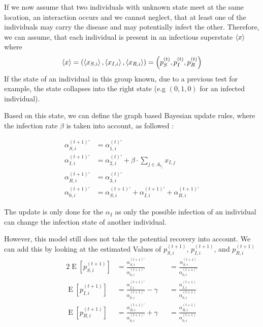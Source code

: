 If we now assume that two individuals with unknown state meet at the same location, an interaction occurs and we cannot neglect, that at least one of the individuals may carry the disease and may potentially infect the other. Therefore, we can assume, that each individual is present in an infectious superstate $\braket{x}$ where
\begin{equation}
    \braket{x} = \left(\braket{x_{S,i}}, \braket{x_{I,i}}, \braket{x_{R,i}}\right) = \left(p_S^{(t)},p_I^{(t)},p_R^{(t)}\right)
\end{equation}
If the state of an individual in this group known, due to a previous test for example, the state collapses into the right state (e.g $(0,1,0)$ for an infected individual).

Based on this state, we can define the graph based Bayesian update rules, where the infection rate $\beta$ is taken into account, as followed \cite{rice2006mathematical}:

\begin{align}
    \alpha_{S,i}^{(t+1)\prime} &= \alpha_{1,i}^{(t)\prime}\\
    \alpha_{I,i}^{(t+1)\prime} &= \alpha_{2,i}^{(t)\prime} + \beta \cdot
    \sum_{j\in A_{v_i}}  x_{I,j}\\
    \alpha_{R,i}^{(t+1)\prime} &= \alpha_{3,i}^{(t)\prime}\\
    \alpha_{0,i}^{(t+1)\prime} &= \alpha_{S,i}^{(t+1)\prime}+\alpha_{I,i}^{(t+1)\prime}+\alpha_{R,i}^{(t+1)\prime}
\end{align}

The update is only done for the $\alpha_I$ as only the possible infection of an individual can change the infection state of another individual.

However, this model still does not take the potential recovery into account. We can add this by looking at the estimated Values of $p_{S,i}^{(t+1)}$, $p_{I,i}^{(t+1)}$, and $p_{R,i}^{(t+1)}$ 
\begin{alignat}{2}
    \operatorname{E}[p_{S,i}^{(t+1)}] &= \frac{\alpha_{S,i}^{(t+1)\prime}}{\alpha_{0,i}^{(t+1)\prime}} & &= \frac{\alpha_{S,i}^{(t+1)}}{\alpha_{0,i}^{(t+1)\prime}} \\
    \operatorname{E}[p_{I,i}^{(t+1)}]&= \frac{\alpha_{I,i}^{(t+1)\prime}}{\alpha_{0,i}^{(t+1)\prime}}-\gamma & &=\frac{\alpha_{I,i}^{(t+1)}}{\alpha_{0,i}^{(t+1)}} \\
    \operatorname{E}[p_{R,i}^{(t+1)}]&= \frac{\alpha_{R,i}^{(t+1)\prime}}{\alpha_{0,i}^{(t+1)\prime}}+\gamma & &= \frac{\alpha_{R,i}^{(t+1)}}{\alpha_{0,i}^{(t+1)}}
\end{alignat}

